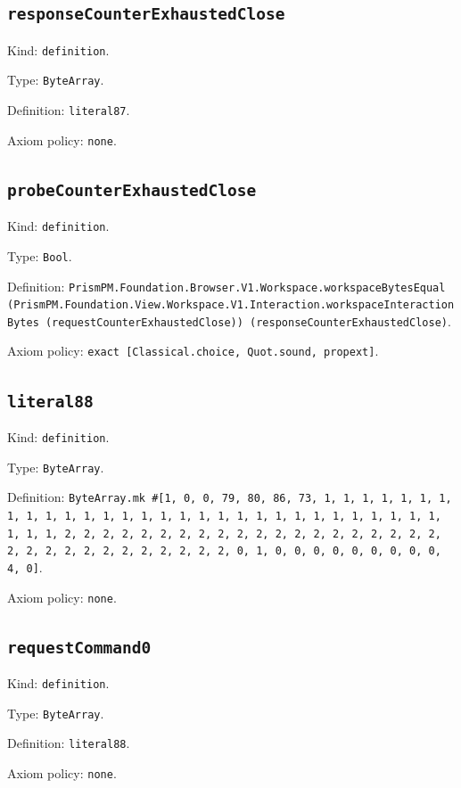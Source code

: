 \documentclass[11pt]{article}
\begin{document}
\subsection*{\texttt{responseCounterExhaustedClose}}
\noindent Kind: \texttt{definition}.\par
\noindent Type: \texttt{ByteArray}.\par
\noindent Definition: \texttt{literal87}.\par
\noindent Axiom policy: \texttt{none}.\par
\subsection*{\texttt{probeCounterExhaustedClose}}
\noindent Kind: \texttt{definition}.\par
\noindent Type: \texttt{Bool}.\par
\noindent Definition: \texttt{PrismPM.Foundation.Browser.V1.Workspace.workspaceBytesEqual (PrismPM.Foundation.View.Workspace.V1.Interaction.workspaceInteractionBytes (requestCounterExhaustedClose)) (responseCounterExhaustedClose)}.\par
\noindent Axiom policy: \texttt{exact [Classical.choice, Quot.sound, propext]}.\par
\subsection*{\texttt{literal88}}
\noindent Kind: \texttt{definition}.\par
\noindent Type: \texttt{ByteArray}.\par
\noindent Definition: \texttt{ByteArray.mk \#[1, 0, 0, 79, 80, 86, 73, 1, 1, 1, 1, 1, 1, 1, 1, 1, 1, 1, 1, 1, 1, 1, 1, 1, 1, 1, 1, 1, 1, 1, 1, 1, 1, 1, 1, 1, 1, 1, 1, 1, 2, 2, 2, 2, 2, 2, 2, 2, 2, 2, 2, 2, 2, 2, 2, 2, 2, 2, 2, 2, 2, 2, 2, 2, 2, 2, 2, 2, 2, 2, 2, 2, 0, 1, 0, 0, 0, 0, 0, 0, 0, 0, 0, 4, 0]}.\par
\noindent Axiom policy: \texttt{none}.\par
\subsection*{\texttt{requestCommand0}}
\noindent Kind: \texttt{definition}.\par
\noindent Type: \texttt{ByteArray}.\par
\noindent Definition: \texttt{literal88}.\par
\noindent Axiom policy: \texttt{none}.\par
\end{document}
